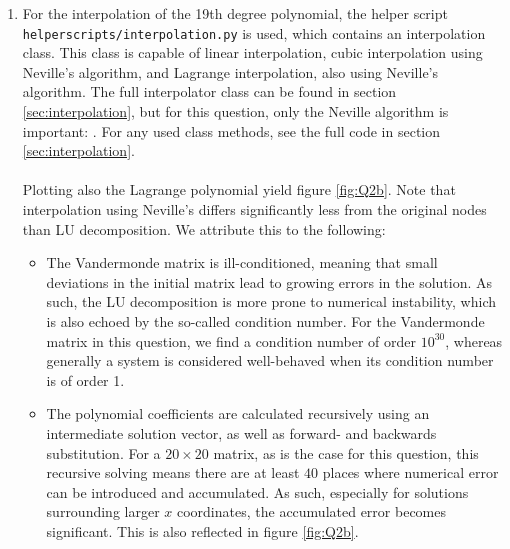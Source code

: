 \begin{enumerate}[label=(\alph*)]
\noindent
With a solution for $\bvec{c}$, a polynomial on 1000 equally-spaced points is created using

Plotting the polynomial, as well as the original nodes, yields figure \ref{fig:Q2a}
\begin{figure}[H]
    \centering
    \texttt{[image: ../figures/02\_vandermonde\_Q2a.png]}
    \caption{Polynomial found using LU decomposition of the Vandermonde matrix. Notice how the absolute difference with the initial points $y_i$ starts small, but grows for points at more positive $x$.}
    \label{fig:Q2a}
\end{figure}

\item For the interpolation of the 19th degree polynomial, the helper script \texttt{helperscripts/interpolation.py} is used, which contains an interpolation class. This class is capable of linear interpolation, cubic interpolation using Neville's algorithm, and Lagrange interpolation, also using Neville's algorithm. The full interpolator class can be found in section \ref{sec:interpolation}, but for this question, only the Neville algorithm is important:
.
For any used class methods, see the full code in section \ref{sec:interpolation}.\\
\\
Plotting also the Lagrange polynomial yield figure \ref{fig:Q2b}. Note that interpolation using Neville's differs significantly less from the original nodes than LU decomposition. We attribute this to the following:
\begin{itemize}
    \item The Vandermonde matrix is ill-conditioned, meaning that small deviations in the initial matrix lead to growing errors in the solution. As such, the LU decomposition is more prone to numerical instability, which is also echoed by the so-called condition number. For the Vandermonde matrix in this question, we find a condition number of order $10^30$, whereas generally a system is considered well-behaved when its condition number is of order 1. 
\item The polynomial coefficients are calculated recursively using an intermediate solution vector, as well as forward- and backwards substitution. For a $20\times20$ matrix, as is the case for this question, this recursive solving means there are at least $40$ places where numerical error can be introduced and accumulated. As such, especially for solutions surrounding larger $x$ coordinates, the accumulated error becomes significant. This is also reflected in figure \ref{fig:Q2b}.
\end{itemize}


\end{enumerate}
